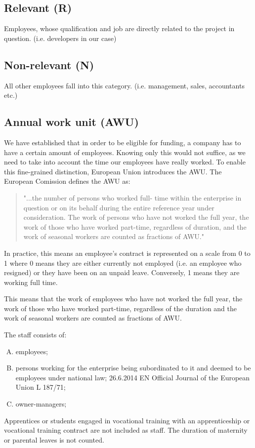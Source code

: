 \documentclass[12pt,oneside]{fithesis2}
\begin{document}
\subsection*{Relevant (R)}
Employees, whose qualification and job are directly related to the project in question. (i.e. developers in our case)\cite[page~30]{czech-rules}
\subsection*{Non-relevant (N)}
All other employees fall into this category. (i.e. management, sales, accountants etc.)\cite[page~30]{czech-rules}
\subsection{Annual work unit (AWU)}
We have established that in order to be eligible for funding, a company has to have a certain amount of employees. Knowing only this would not suffice, as we need to take into account the time our employees have really worked. To enable this fine-grained distinction, European Union introduces the AWU.
\newline\newline
The European Comission defines the AWU as:
\blockquote{"...the number of persons who worked full- time within the enterprise in question or on its behalf during the entire reference year under consideration. The work of persons who have not worked the full year, the work of those who have worked part-time, regardless of duration, and the work of seasonal workers are counted as fractions of AWU."\cite[page~71]{eu-commision-regulation}}
\newpage
In practice, this means an employee's contract is represented on a scale from 0 to 1 where 0 means they are either currently not employed (i.e. an employee who resigned) or they have been on an unpaid leave. Conversely, 1 means they are working full time.

This means that the work of employees who have not worked the full year, the work of those who have worked part-time, regardless of the duration and the work of seasonal workers are counted as fractions of AWU.

\newline\newline The staff consists of:
\begin{enumerate}[A)]
    \item employees;
    \item persons working for the enterprise being subordinated to it and deemed to be employees under national law; 26.6.2014 EN Official Journal of the European Union L 187/71;
    \item owner-managers;
\end{enumerate}
Apprentices or students engaged in vocational training with an apprenticeship or vocational training contract are not included as staff. The duration of maternity or parental leaves is not counted. \cite{eu-commision-regulation}
\end{document}
